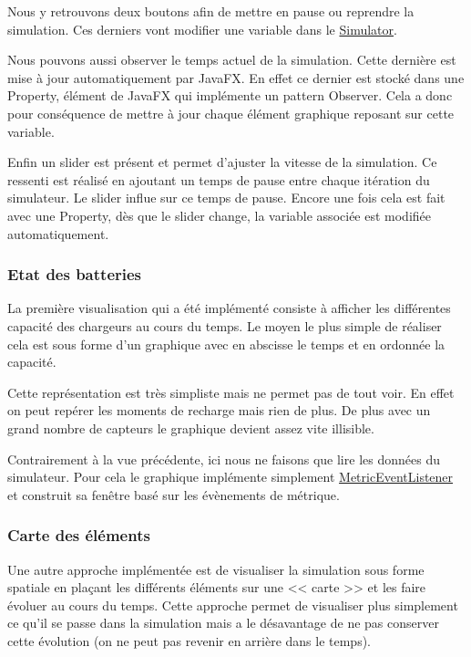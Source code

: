 \documentclass[final]{polytech/polytech}
\newcommand{\klass}[1]{\hyperref[class:#1]{#1}}
\begin{document}
				
				Nous y retrouvons deux boutons afin de mettre en pause ou reprendre la simulation.
				Ces derniers vont modifier une variable dans le \klass{Simulator}.
				
				Nous pouvons aussi observer le temps actuel de la simulation.
				Cette dernière est mise à jour automatiquement par JavaFX.
				En effet ce dernier est stocké dans une Property, élément de JavaFX qui implémente un pattern Observer.
				Cela a donc pour conséquence de mettre à jour chaque élément graphique reposant sur cette variable.
				
				Enfin un slider est présent et permet d'ajuster la vitesse de la simulation.
				Ce ressenti est réalisé en ajoutant un temps de pause entre chaque itération du simulateur.
				Le slider influe sur ce temps de pause.
				Encore une fois cela est fait avec une Property, dès que le slider change, la variable associée est modifiée automatiquement.
			
			\subsubsection{Etat des batteries}
				La première visualisation qui a été implémenté consiste à afficher les différentes capacité des chargeurs au cours du temps.
				Le moyen le plus simple de réaliser cela est sous forme d'un graphique avec en abscisse le temps et en ordonnée la capacité.
				
				Cette représentation est très simpliste mais ne permet pas de tout voir.
				En effet on peut repérer les moments de recharge mais rien de plus.
				De plus avec un grand nombre de capteurs le graphique devient assez vite illisible.

				Contrairement à la vue précédente, ici nous ne faisons que lire les données du simulateur.
				Pour cela le graphique implémente simplement \klass{MetricEventListener} et construit sa fenêtre basé sur les évènements de métrique.
				
							
			\subsubsection{Carte des éléments}
				
				Une autre approche implémentée est de visualiser la simulation sous forme spatiale en plaçant les différents éléments sur une << carte >> et les faire évoluer au cours du temps.
				Cette approche permet de visualiser plus simplement ce qu'il se passe dans la simulation mais a le désavantage de ne pas conserver cette évolution (on ne peut pas revenir en arrière dans le temps).
				
\end{document}
